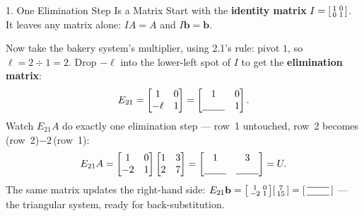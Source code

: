 \documentclass[10pt]{article}
\newcommand{\bb}{\mathbf{b}}
\begin{document}
\begin{notesbox}{1. One Elimination Step Is a Matrix}
Start with the \textbf{identity matrix} $I=\begin{bsmallmatrix} 1&0\\0&1 \end{bsmallmatrix}$. It leaves
any matrix alone: $IA=A$ and $I\bb=\bb$.

\vspace{3pt}
Now take the bakery system's multiplier, using 2.1's rule: pivot $1$, so $\ell=2\div1=2$. Drop $-\ell$ into the
lower-left spot of $I$ to get the \textbf{elimination matrix}:
\[
  E_{21} = \begin{bmatrix} 1 & 0 \\ -\ell & 1 \end{bmatrix} = \begin{bmatrix} 1 & 0 \\ \blank{0.8cm} & 1 \end{bmatrix}.
\]
Watch $E_{21}A$ do exactly one elimination step --- row~1 untouched, row~2 becomes (row~2)$-2\,$(row~1):
\[
  E_{21}A = \begin{bmatrix} 1 & 0 \\ -2 & 1 \end{bmatrix}\begin{bmatrix} 1 & 3 \\ 2 & 7 \end{bmatrix}
  = \begin{bmatrix} 1 & 3 \\ \blank{0.8cm} & \blank{0.8cm} \end{bmatrix} = U.
\]
The same matrix updates the right-hand side: $E_{21}\bb=\begin{bsmallmatrix} 1&0\\-2&1 \end{bsmallmatrix}\begin{bsmallmatrix} 7\\15 \end{bsmallmatrix}=\begin{bsmallmatrix}\blank{0.8cm}\\[2pt]\blank{0.8cm}\end{bsmallmatrix}$ ---
the triangular system, ready for back-substitution.
\end{notesbox}
\end{document}
